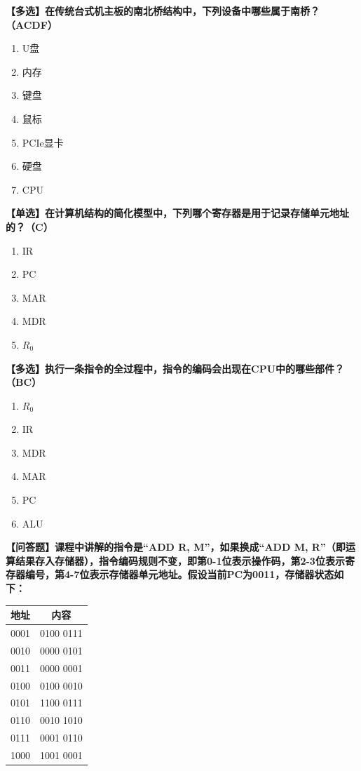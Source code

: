 \documentclass[12pt, a4paper]{ctexart}
\begin{document}
\textbf{【多选】在传统台式机主板的南北桥结构中，下列设备中哪些属于南桥？（ACDF）}
\begin{enumerate}[label=\Alph*., itemsep=2pt, parsep=0pt]
    \item U盘
    \item 内存
    \item 键盘
    \item 鼠标
    \item PCIe显卡
    \item 硬盘
    \item CPU
\end{enumerate}
\vspace{0.4cm}


\textbf{【单选】在计算机结构的简化模型中，下列哪个寄存器是用于记录存储单元地址的？（C）}
\begin{enumerate}[label=\Alph*., itemsep=2pt, parsep=0pt]
    \item IR 
    \item PC 
    \item MAR
    \item MDR
    \item $R_0$
\end{enumerate}
\vspace{0.4cm}


\textbf{【多选】执行一条指令的全过程中，指令的编码会出现在CPU中的哪些部件？（BC）}
\begin{enumerate}[label=\Alph*., itemsep=2pt, parsep=0pt]
    \item $R_0$
    \item IR
    \item MDR
    \item MAR
    \item PC
    \item ALU
\end{enumerate}
\vspace{0.6cm}

\newpage

\textbf{【问答题】课程中讲解的指令是“ADD R, M”，如果换成“ADD M, R”（即运算结果存入存储器），指令编码规则不变，即第0-1位表示操作码，第2-3位表示寄存器编号，第4-7位表示存储器单元地址。假设当前PC为0011，存储器状态如下：}

\begin{table}[htbp]
    \centering
    \begin{tabular}{cc}
        \toprule
        \textbf{地址} & \textbf{内容} \\
        \midrule
        0001 & 0100 0111 \\
        0010 & 0000 0101 \\
        0011 & 0000 0001 \\
        0100 & 0100 0010 \\
        0101 & 1100 0111 \\
        0110 & 0010 1010 \\
        0111 & 0001 0110 \\
        1000 & 1001 0001 \\
        \bottomrule
    \end{tabular}
\end{table}
\end{document}

